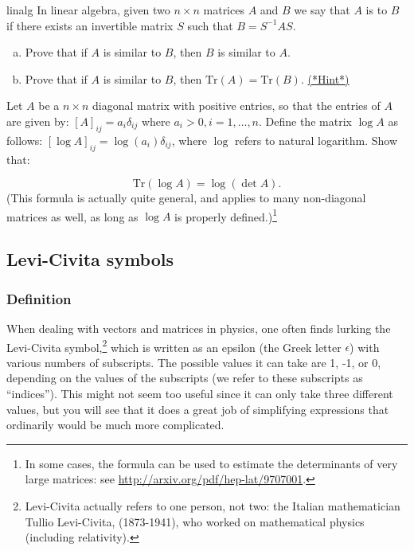 \begin {exercise}{linalg}
In linear algebra, given two $n \times n$ matrices $A$ and $B$ we say that $A$ is  to $B$ if there exists an invertible matrix $S$ such that $B = S^{-1}AS$. 
\begin{enumerate}[(a)]
\item
Prove that if $A$ is similar to $B$, then $B$ is similar to $A$.
\item
Prove that if $A$ is similar to $B$, then $\text{Tr} ({A}) = \text{Tr} ({B})$. 
\hyperref[sec:sigma:hints]{(*Hint*)} 
\end{enumerate}
\end{exercise}

\begin {exercise}{}
Let $A$ be a $n \times n$ diagonal matrix with positive entries, so that the entries of $A$ are given by:  $ [A]_{ij} = a_{i} \delta_{ij}$ where $a_i > 0, i = 1, \ldots, n$.  Define the matrix $\log A$ as follows:  $ [\log A]_{ij} = \log(a_{i}) \delta_{ij}$, where $\log$ refers to natural logarithm.  Show that:

\[ \text{Tr}(\log A) = \log (\det A). \]
(This formula is actually quite general, and applies to many non-diagonal matrices as well, as long as $\log A$ is properly defined.)\footnote{In some cases, the formula can be used to estimate the determinants of very large matrices: see \url{http://arxiv.org/pdf/hep-lat/9707001}.} 


\end{exercise}



\subsection{Levi-Civita symbols}
\subsubsection*{Definition}
When dealing with vectors and matrices in physics, one often finds lurking  the Levi-Civita symbol,\footnote{Levi-Civita actually refers to one person, not two: the Italian mathematician Tullio Levi-Civita, (1873-1941), who worked on mathematical physics (including relativity).} which is written as an epsilon (the Greek letter $\epsilon$) with various numbers of subscripts.  The possible values it can take are 1, -1, or 0, depending on the values of the subscripts (we refer to these subscripts as ``indices'').  This might not seem too useful since it can only take three different values, but you will see that it does a great job of simplifying expressions that ordinarily would be much more complicated.  

